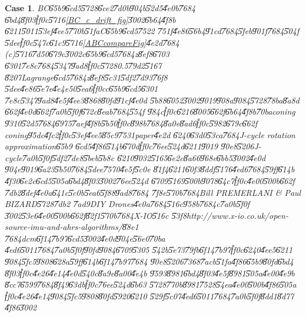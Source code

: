 \documentclass[12pt,a4paper]{article}
\newtheorem{case}[theorem]{Case}
\begin{document}
\begin{case}
BC\U{65b9}\U{6cd5}\U{5728}\U{6ce2}\U{7d0b}\U{904b}\U{52d5}\U{4e0b}\U{7684}%
\U{6bd4}\U{8f03}\U{ff0c}\U{5716}\ref{BC_c_drift_fig}\U{3002}\U{6b64}\U{4f8b}%
\U{6211}\U{5011}\U{53ef}\U{4ee5}\U{770b}\U{51fa}C\U{65b9}\U{6cd5}\U{7522}%
\U{751f}\U{4e86}\U{56b4}\U{91cd}\U{7684}\U{5feb}\U{901f}\U{7684}\U{504f}%
\U{5dee}\U{ff0c}\U{547c}\U{61c9}\U{5716}\ref{ABCcompareFig}\U{4e2d}\U{7684}%
(c)\U{5716}\U{7d50}\U{679c}\U{3002}c\U{65b9}\U{6cd5}\U{7684}z\U{8ef8}\U{6703}%
\U{6301}\U{7e8c}\U{7684}\U{5347}\U{9ad8}\U{ff0c}\U{5728}0.5\U{79d2}\U{5167}%
\U{8207}Lagrange\U{6cd5}\U{7684}z\U{8ef8}\U{5c31}\U{5df2}\U{7d93}\U{76f8}%
\U{5dee}\U{4e86}\U{5e7e}\U{4e4e}50\U{5ea6}\U{ff0c}c\U{65b9}\U{6cd5}\U{6301}%
\U{7e8c}\U{5347}\U{9ad8}\U{4e5f}\U{4ee3}\U{8868}\U{80fd}\U{91cf}\U{4e0d}%
\U{5b88}\U{6052}\U{3002}\U{9019}\U{908a}\U{9084}\U{5728}\U{78ba}\U{8a8d}%
\U{662f}\U{4e0d}\U{662f}\U{7a0b}\U{5f0f}\U{672c}\U{8eab}\U{7684}\U{554f}%
\U{984c}\U{ff0c}\U{6216}\U{8005}\U{662f}\U{6b64}\U{4f8b}\U{70ba}coning%
\U{9310}\U{52d5}\U{7684}\U{6975}\U{7aef}\U{4f8b}\U{5b50}\U{ff0c}\U{898b}\cite%
[Page 23]{savage}\U{7684}\U{8a0e}\U{8ad6}\U{ff0c}\U{5982}\U{679c}\U{662f}%
coning\U{95dc}\U{4fc2}\U{ff0c}\U{53ef}\U{4ee5}\U{85c9}\U{7531}paper\U{4e2d}%
\U{6240}\U{63d0}\U{53ca}\U{7684}J-cycle rotation approximation\U{65b9}%
\U{6cd5}\U{4f86}\U{514b}\U{670d}\U{ff0c}\U{76ee}\U{524d}\U{6211}\U{9019}%
\U{90e8}\U{5206}J-cycle\U{7a0b}\U{5f0f}\U{5df2}\U{7de8}\U{5beb}\U{5b8c}%
\U{6210}\U{9032}\U{5165}\U{6e2c}\U{8a66}\U{968e}\U{6bb5}\U{3002}\U{4e0d}%
\U{904e}\U{9019}\U{6a23}\U{5b50}\U{7684}\U{5dee}\U{7570}\U{4e5f}\U{5c0e}%
\U{81f4}\U{6211}\U{60f3}\U{8ddf}\U{5176}\U{4ed6}\U{7684}\U{59ff}\U{614b}%
\U{4f30}\U{6e2c}\U{6cd5}\U{505a}\U{6bd4}\U{8f03}\U{3002}\U{76ee}\U{524d}%
\U{6709}\U{5169}\U{500b}\U{9078}\U{64c7}\U{ff0c}\U{4e00}\U{500b}\U{662f}%
\U{7db2}\U{8def}\U{4e0a}\U{641c}\U{5c0b}\U{5ea6}\U{5f88}\U{9ad8}\U{7684}%
\U{7f8e}\U{570b}\U{7684}Bill PREMERLANI \& Paul BIZARD\U{5728}\U{7db2}%
\U{7ad9}DIY Drones\U{4e0a}\U{7684}\U{516c}\U{958b}\U{7684}c\U{7a0b}\U{5f0f}%
\U{3002}\U{53e6}\U{4e00}\U{500b}\U{662f}\U{82f1}\U{570b}\U{7684}X-IO\U{516c}%
\U{53f8}http://www.x-io.co.uk/open-source-imu-and-ahrs-algorithms/\U{88e1}%
\U{7684}dcm\U{6f14}\U{7b97}\U{6cd5}\U{3002}\U{4e0d}\U{904e}\U{56e0}\U{70ba}%
\U{4ed6}\U{5011}\U{7684}\U{7a0b}\U{5f0f}\U{90fd}\U{9084}\U{6709}\U{5305}%
\U{542b}\U{5e73}\U{79fb}\U{6f14}\U{7b97}\U{ff0c}\U{6240}\U{4ee5}\U{6211}%
\U{9084}\U{5fc5}\U{9808}\U{628a}\U{59ff}\U{614b}\U{6f14}\U{7b97}\U{7684}%
\U{90e8}\U{5206}\U{7368}\U{7acb}\U{51fa}\U{4f86}\U{65b9}\U{80fd}\U{6bd4}%
\U{8f03}\U{ff0c}\U{4e26}\U{4e14}\U{4e0d}\U{540c}\U{8a9e}\U{8a00}\U{4e4b}%
\U{9593}\U{8981}\U{6bd4}\U{8f03}\U{4e5f}\U{8981}\U{505a}\U{4e00}\U{4e9b}%
\U{8cc7}\U{6599}\U{7684}\U{8f49}\U{63db}\U{ff0c}\U{76ee}\U{524d}\U{6b63}%
\U{5728}\U{770b}\U{8981}\U{7528}\U{54ea}\U{4e00}\U{500b}\U{4f86}\U{505a}%
\U{ff0c}\U{4e26}\U{4e14}\U{9084}\U{5fc5}\U{9808}\U{80fd}\U{5920}\U{6210}%
\U{529f}\U{5c07}\U{4ed6}\U{5011}\U{7684}\U{7a0b}\U{5f0f}\U{8dd1}\U{8d77}%
\U{4f86}\U{3002}
\end{case}
\end{document}
